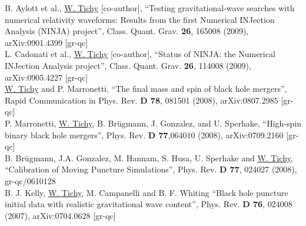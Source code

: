 B. Aylott et al., \underline{W. Tichy} [co-author],
``Testing gravitational-wave searches with numerical relativity waveforms:
Results from the first Numerical INJection Analysis (NINJA) project'',
Class. Quant. Grav. {\bf 26}, 165008 (2009), arXiv:0901.4399 [gr-qc]
\\

L. Cadonati et al., \underline{W. Tichy} [co-author],
``Status of NINJA: the Numerical INJection Analysis project'',
Class. Quant. Grav. {\bf 26}, 114008 (2009), arXiv:0905.4227 [gr-qc]
\\

\underline{W. Tichy} and P. Marronetti,
``The final mass and spin of black hole mergers'',
Rapid Communication in Phys. Rev. {\bf D 78}, 081501 (2008),
arXiv:0807.2985 [gr-qc]
\\

P. Marronetti, \underline{W. Tichy}, B. Br\"ugmann, J. Gonzalez, 
and U. Sperhake, ``High-spin binary black hole mergers'',
Phys. Rev. {\bf D 77},064010 (2008), arXiv:0709.2160 [gr-qc]
\\

B. Br\"ugmann, J.A. Gonzalez, M. Hannam, S. Husa, U. Sperhake
and \underline{W. Tichy},
``Calibration of Moving Puncture Simulations'', 
Phys. Rev. {\bf D 77}, 024027 (2008), gr-qc/0610128
\\

B. J. Kelly, \underline{W. Tichy}, M. Campanelli and B. F. Whiting
``Black hole puncture initial data with realistic gravitational wave content'',
Phys. Rev. {\bf D 76}, 024008 (2007), arXiv:0704.0628 [gr-qc]
\\

